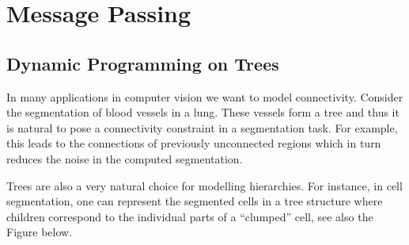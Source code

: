 \chapter{Message Passing}%
\label{chap:07}

\section{Dynamic Programming on Trees}
In many applications in computer vision we want to model
connectivity. Consider the segmentation of blood vessels in a
lung. These vessels form a tree and thus it is natural to pose a
connectivity constraint in a segmentation task. For example, this
leads to the connections of previously unconnected regions which in
turn reduces the noise in the computed segmentation.

Trees are also a very natural choice for modelling hierarchies. For
instance, in cell segmentation, one can represent the segmented cells
in a tree structure where children correspond to the individual parts
of a ``clumped'' cell, see also the Figure below.

